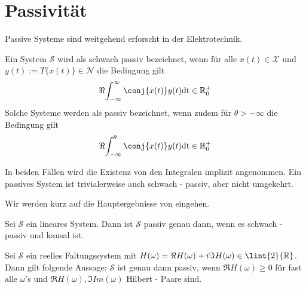 \section{Passivität}
Passive Systeme sind weitgehend erforscht in der Elektrotechnik.
\begin{defi}
 Ein System $\mathscr{S}$ wird als schwach passiv bezeichnet, wenn für alle $x(t) \in \mathscr{X}$ und $y(t) := T\{ x(t)\} \in \mathscr{N}$ die Bedingung gilt
 \begin{align}
 	\Re{\int_{-\infty}^{\infty} \conj{x(t)} y(t) \mathrm{dt}} \in \mathbb{R}^+_0
 \end{align}
 Solche Systeme werden als passiv bezeichnet, wenn zudem für $\theta > - \infty$ die Bedingung gilt
 \begin{align}
 	\Re{\int_{-\infty}^{\theta} \conj{x(t)} y(t) \mathrm{dt}} \in \mathbb{R}^+_0
 \end{align}
\end{defi}
\begin{bem}
In beiden Fällen wird die Existenz von den Integralen implizit angenommen. Ein passives System ist trivialerweise auch schwach - passiv, aber nicht umgekehrt.
\end{bem}
Wir werden kurz auf die Hauptergebnisse von \cite{Dambrowski2013} eingehen. 
\begin{satz} \label{sys:passiv}
	Sei $\mathscr{S}$ ein lineares System. Dann ist $\mathscr{S}$ passiv genau dann, wenn es schwach - passiv und kausal ist. 
\end{satz}

\begin{satz}
Sei $\mathscr{S}$ ein reelles Faltungssystem mit $H(\omega) = \Re{H(\omega)} + i \Im{H(\omega)} \in \lint{2}{\mathbb{R}}$. Dann gilt folgende Aussage: $\mathscr{S}$ ist genau dann passiv, wenn $\Re{H(\omega)} \geq 0$ für fast alle $\omega$'s und $\Re{H(\omega)}, \Im{Im(\omega)}$ Hilbert - Paare sind.
\end{satz}



